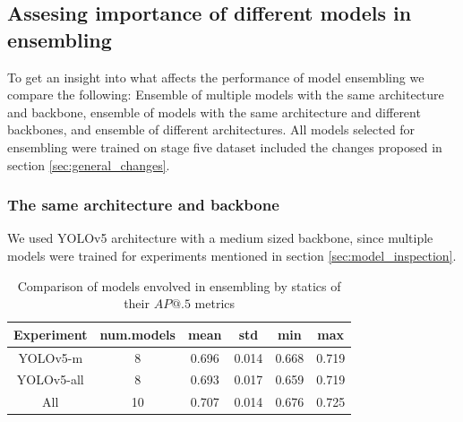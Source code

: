 \subsection{Assesing importance of different models in ensembling}
To get an insight into what affects the performance of model ensembling we compare the following: Ensemble of multiple models with the same architecture and backbone, ensemble of models with the same architecture and different backbones, and ensemble of different architectures. All models selected for ensembling were trained on stage five dataset included the changes proposed in section \ref{sec:general_changes}.


\subsubsection{The same architecture and backbone}
We used YOLOv5 architecture with a medium sized backbone, since multiple models were trained for experiments mentioned in section \ref{sec:model_inspection}.

\begin{table}[h]
    \centering
    \begin{tabular}{|c|c|c|c|c|c|}
        \hline
        Experiment & num.models & mean  & std   & min   & max   \\ \hline
        YOLOv5-m   & 8          & 0.696 & 0.014 & 0.668 & 0.719 \\ \hline
        YOLOv5-all & 8          & 0.693 & 0.017 & 0.659 & 0.719 \\ \hline
        All        & 10         & 0.707 & 0.014 & 0.676 & 0.725 \\ \hline
    \end{tabular}
    \caption{Comparison of models envolved in ensembling by statics of their $AP@.5$ metrics}
    \label{tab:ensemlbe_models_envolved}
\end{table}